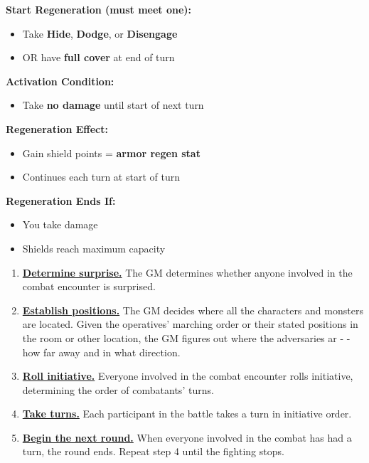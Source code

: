 \begin{scifitablebox}[screenbox,title=\textcolor{PanelGlow}{Shields (Quick Reference)}]

\textbf{Start Regeneration (must meet one):}
\begin{itemize}
\item Take \textbf{Hide}, \textbf{Dodge}, or \textbf{Disengage}
\item OR have \textbf{full cover} at end of turn
\end{itemize}

\textbf{Activation Condition:}
\begin{itemize}
\item Take \textbf{no damage} until start of next turn
\end{itemize}

\textbf{Regeneration Effect:}
\begin{itemize}
\item Gain shield points = \textbf{armor regen stat}
\item Continues each turn at start of turn
\end{itemize}

\textbf{Regeneration Ends If:}
\begin{itemize}
\item You take damage
\item Shields reach maximum capacity
\end{itemize}

\end{scifitablebox}


\begin{scifitablebox}[screenbox,title=\textcolor{PanelGlow}{Combat Step by Step}]
\begin{enumerate}
  \item \textbf{\underline{Determine surprise.}}\newline
  The GM determines whether anyone involved in the combat encounter is surprised.  
  \item \textbf{\underline{Establish positions.}}\newline
  The GM decides where all the characters and monsters are located. Given the operatives' marching order or their stated positions in the room or other location, the GM figures out where the adversaries ar - -how far away and in what direction.
  \item \textbf{\underline{Roll initiative.}}\newline
  Everyone involved in the combat encounter rolls initiative, determining the order of combatants' turns.
  \item \textbf{\underline{Take turns.}}\newline
  Each participant in the battle takes a turn in initiative order.
  \item \textbf{\underline{Begin the next round.}}\newline
  When everyone involved in the combat has had a turn, the round ends. Repeat step 4 until the fighting stops.
\end{enumerate}
\end{scifitablebox}

